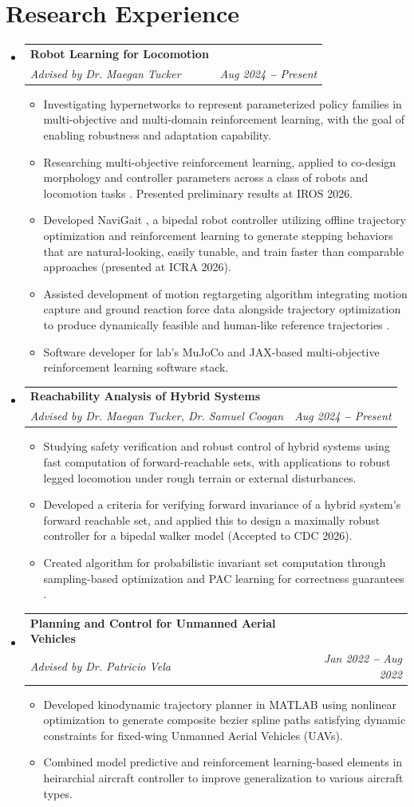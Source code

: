 \documentclass[letterpaper,11pt]{article}
\makeatletter
\newcommand{\resumeItem}[1]{
  \item\small{
    {#1 \vspace{-2pt}}
  }
}
\newcommand{\resumeSubheading}[4]{
  \vspace{-2pt}\item
    \begin{tabular*}{0.97\textwidth}[t]{l@{\extracolsep{\fill}}r}
      \textbf{#1} & #2 \\
      \textit{\small#3} & \textit{\small #4} \\
    \end{tabular*}\vspace{-7pt}
}
\newcommand{\resumeSubHeadingListStart}{\begin{itemize}[leftmargin=0.15in, label={}]}
\newcommand{\resumeSubHeadingListEnd}{\end{itemize}}
\newcommand{\resumeItemListStart}{\begin{itemize}}
\newcommand{\resumeItemListEnd}{\end{itemize}\vspace{-5pt}}
\makeatother
\begin{document}
\section{Research Experience}
  \vspace{3pt}
  \resumeSubHeadingListStart
    \resumeSubheading
      {Robot Learning for Locomotion}{}
      {Advised by Dr. Maegan Tucker}{Aug 2024 \textbf{--} Present}
      \resumeItemListStart
        \resumeItem{Investigating hypernetworks to represent parameterized policy families in multi-objective and multi-domain reinforcement learning, with the goal of enabling robustness and adaptation capability.}
        \resumeItem{Researching multi-objective reinforcement learning, applied to co-design morphology and controller parameters across a class of robots and locomotion tasks \cite{madabushi2026mocha}. Presented preliminary results at IROS 2026.}
        \resumeItem{Developed NaviGait \cite{janwani2026navigait}, a bipedal robot controller utilizing offline trajectory optimization and reinforcement learning to generate stepping behaviors that are 
        natural-looking, easily tunable, and train faster than comparable approaches (presented at ICRA 2026).}
        \resumeItem{Assisted development of motion regtargeting algorithm integrating motion capture and ground reaction force data alongside trajectory
        optimization to produce dynamically feasible and human-like reference trajectories \cite{zhang2026kinodynamic}.}
        \resumeItem{Software developer for lab's MuJoCo and JAX-based multi-objective reinforcement learning software stack.}
      \resumeItemListEnd 
    \resumeSubheading
      {Reachability Analysis of Hybrid Systems}{}
      {Advised by Dr. Maegan Tucker, Dr. Samuel Coogan}{Aug 2024 \textbf{--} Present}
      \resumeItemListStart
        \resumeItem{Studying safety verification and robust control of hybrid systems using fast computation of forward-reachable sets, with applications to robust legged locomotion under rough terrain or external disturbances.}
        \resumeItem{Developed a criteria for verifying forward invariance of a hybrid system's forward reachable set, and applied this to design a maximally robust controller for a bipedal walker model \cite{madabushi2026differentiableinvariant} (Accepted to CDC 2026).}
        \resumeItem{Created algorithm for probabilistic invariant set computation through sampling-based optimization and PAC learning for correctness guarantees \cite{madabushi2026finitestep}.}
      \resumeItemListEnd 
    \resumeSubheading
      {Planning and Control for Unmanned Aerial Vehicles}{}
      {Advised by Dr. Patricio Vela}{Jan 2022 \textbf{--} Aug 2022}
        \resumeItemListStart
          \resumeItem{Developed kinodynamic trajectory planner in MATLAB using nonlinear optimization to generate composite bezier spline paths satisfying dynamic constraints for fixed-wing Unmanned Aerial Vehicles (UAVs).}
          \resumeItem{Combined model predictive and reinforcement learning-based elements in heirarchial aircraft controller to improve generalization to various aircraft types.}
    \resumeItemListEnd
  \resumeSubHeadingListEnd
\end{document}
